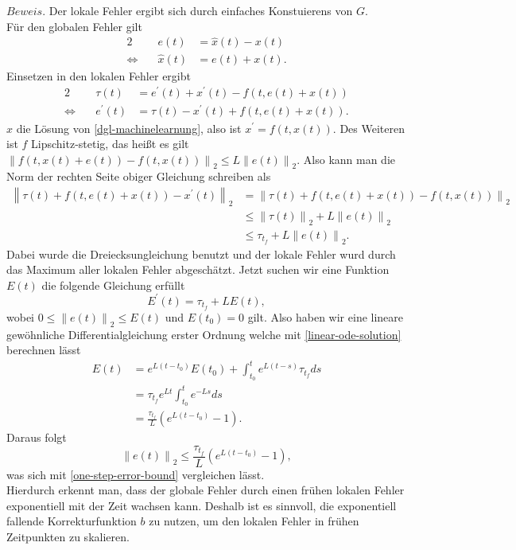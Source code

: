 $Beweis.$ Der lokale Fehler ergibt sich durch einfaches Konstuierens von $G$.\\
Für den globalen Fehler gilt
\begin{alignat*}{2}
    &e(t) &= \hat{x}(t) - x(t)\\
    \Leftrightarrow \quad &\hat{x}(t) &= e(t) + x(t).
\end{alignat*}
Einsetzen in den lokalen Fehler ergibt
\begin{alignat*}{2}
    &\tau(t) &= e^{\prime}(t) + x^{\prime}(t) - f(t,e(t)+x(t))\\
    \Leftrightarrow \quad &e^{\prime}(t) &= \tau(t) - x^{\prime}(t) + f(t,e(t) + x(t)).
\end{alignat*}
$x$ die Lösung von \eqref{dgl-machinelearnung}, also ist $x^{\prime}=f(t,x(t))$. Des Weiteren ist $f$ Lipschitz-stetig,
das heißt es gilt $\left\lVert f(t,x(t)+e(t)) - f(t,x(t)) \right\rVert_2 \leq L \left\lVert e(t) \right\rVert_2$. Also kann
man die Norm der rechten Seite obiger Gleichung schreiben als
\begin{align*}
    \left\lVert \tau(t) + f(t,e(t) + x(t)) - x^{\prime}(t) \right\rVert_2
    &= \left\lVert \tau(t) + f(t,e(t) + x(t)) - f(t,x(t)) \right\rVert_2 \\
    &\leq \left\lVert \tau(t) \right\rVert_2 + L\left\lVert e(t) \right\rVert_2 \\
    &\leq \tau_{t_f} + L \left\lVert e(t) \right\rVert_2.
\end{align*}
Dabei wurde die Dreiecksungleichung benutzt und der lokale Fehler wurd durch das Maximum aller lokalen Fehler
abgeschätzt. Jetzt suchen wir eine Funktion $E(t)$ die folgende Gleichung erfüllt
\[
    E^{\prime}(t) = \tau_{t_f} + L E(t),
\]
wobei $0 \leq \left\lVert e(t) \right\rVert_2 \leq E(t)$ und $E(t_0) = 0$ gilt. Also haben wir eine lineare gewöhnliche
Differentialgleichung erster Ordnung welche mit \eqref{linear-ode-solution} berechnen lässt
\begin{align*}
    E(t) &= e^{L(t-t_0)}E(t_0) + \int_{t_0}^{t}e^{L(t-s)}\tau_{t_f} ds \\
    &= \tau_{t_f} e^{Lt} \int_{t_0}^{t}e^{-Ls} ds \\
    &= \frac{\tau_{t_f} }{L} \left( e^{L(t-t_0)} - 1 \right).
\end{align*}
Daraus folgt
\[
    \left\lVert e(t) \right\rVert_2 \leq \frac{\tau_{t_f}}{L} \left( e^{L(t-t_0)} - 1 \right),
\]
was sich mit \eqref{one-step-error-bound} vergleichen lässt. \qedwhite\\
Hierdurch erkennt man, dass der globale Fehler durch einen frühen lokalen Fehler exponentiell mit der Zeit wachsen
kann. Deshalb ist es sinnvoll, die exponentiell fallende Korrekturfunktion $b$ zu nutzen, um den lokalen Fehler in
frühen Zeitpunkten zu skalieren.

